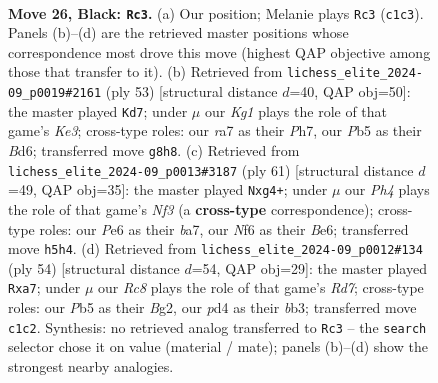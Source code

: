 \documentclass[11pt]{article}
\begin{document}
\clearpage

\begin{figure}[p]\centering
\begin{subfigure}{0.46\textwidth}\centering
\resizebox{\linewidth}{!}{%
\newchessgame
\chessboard[
  setfen={4b1k1/R4pp1/4pn2/1p5p/3P1P2/1P4PP/1N2P3/2r2BK1 b - - 0 26},
  showmover=false,
  pgfstyle=straightmove, color=movearrow, markmove={c1-c3}
]}
\caption{}
\end{subfigure}\hfill
\begin{subfigure}{0.46\textwidth}\centering
\resizebox{\linewidth}{!}{%
\newchessgame
\chessboard[
  setfen={8/2n3pp/3bkp2/1p1p4/3P2PP/2PN4/r2BKP2/1R6 b - - 0 27},
  showmover=false,
  pgfstyle=straightmove, color=movearrow, markmove={e6-d7}
]}
\caption{}
\end{subfigure}
\\[4pt]
\begin{subfigure}{0.46\textwidth}\centering
\resizebox{\linewidth}{!}{%
\newchessgame
\chessboard[
  setfen={6k1/Bp3pp1/4bn1p/3p4/3P2P1/5P2/1pr1NK1P/1R6 b - - 0 31},
  showmover=false,
  pgfstyle=straightmove, color=movearrow, markmove={f6-g4}
]}
\caption{}
\end{subfigure}\hfill
\begin{subfigure}{0.46\textwidth}\centering
\resizebox{\linewidth}{!}{%
\newchessgame
\chessboard[
  setfen={4r1k1/p2R1pb1/n1p3pp/BpP5/8/1b2PNP1/5PBP/6K1 w - - 2 28},
  showmover=false,
  pgfstyle=straightmove, color=movearrow, markmove={d7-a7}
]}
\caption{}
\end{subfigure}
\caption{\textbf{Move 26, Black: \texttt{Rc3}.} (a) Our position; Melanie plays \texttt{Rc3} (\texttt{c1c3}). Panels (b)--(d) are the retrieved master positions whose correspondence most drove this move (highest QAP objective among those that transfer to it). (b) Retrieved from \texttt{lichess\_elite\_2024-09\_p0019\#2161} (ply 53) [structural distance $d$=40, QAP obj=50]: the master played \texttt{Kd7}; under $\mu$ our \emph{Kg1} plays the role of that game's \emph{Ke3}; cross-type roles: our \emph{r}a7 as their \emph{P}h7, our \emph{P}b5 as their \emph{B}d6; transferred move \texttt{g8h8}. (c) Retrieved from \texttt{lichess\_elite\_2024-09\_p0013\#3187} (ply 61) [structural distance $d$=49, QAP obj=35]: the master played \texttt{Nxg4+}; under $\mu$ our \emph{Ph4} plays the role of that game's \emph{Nf3} (a \textbf{cross-type} correspondence); cross-type roles: our \emph{P}e6 as their \emph{b}a7, our \emph{N}f6 as their \emph{B}e6; transferred move \texttt{h5h4}. (d) Retrieved from \texttt{lichess\_elite\_2024-09\_p0012\#134} (ply 54) [structural distance $d$=54, QAP obj=29]: the master played \texttt{Rxa7}; under $\mu$ our \emph{Rc8} plays the role of that game's \emph{Rd7}; cross-type roles: our \emph{P}b5 as their \emph{B}g2, our \emph{p}d4 as their \emph{b}b3; transferred move \texttt{c1c2}. Synthesis: no retrieved analog transferred to \texttt{Rc3} -- the \texttt{search} selector chose it on value (material / mate); panels (b)--(d) show the strongest nearby analogies.}
\label{fig:thought-m51}
\end{figure}
\end{document}
